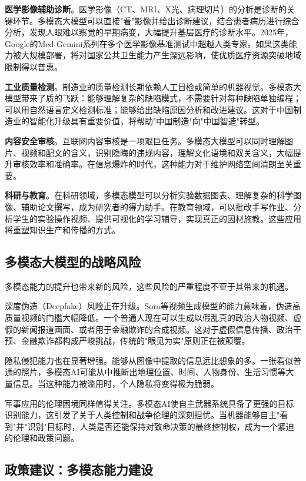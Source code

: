 \textbf{医学影像辅助诊断}。医学影像（CT、MRI、X光、病理切片）的分析是诊断的关键环节。多模态大模型可以直接"看"影像并给出诊断建议，结合患者病历进行综合分析，发现人眼难以察觉的早期病变，大幅提升基层医疗的诊断水平。2025年，Google的Med-Gemini系列在多个医学影像基准测试中超越人类专家。如果这类能力被大规模部署，将对国家公共卫生能力产生深远影响，使优质医疗资源突破地域限制得以普惠。

\textbf{工业质量检测}。制造业的质量检测长期依赖人工目检或简单的机器视觉。多模态大模型带来了质的飞跃：能够理解复杂的缺陷模式，不需要针对每种缺陷单独编程；可以用自然语言定义检测标准；能够给出缺陷原因分析和改进建议。这对于中国制造业的智能化升级具有重要价值，将帮助"中国制造"向"中国智造"转型。

\textbf{内容安全审核}。互联网内容审核是一项艰巨任务。多模态大模型可以同时理解图片、视频和配文的含义，识别隐晦的违规内容，理解文化语境和双关含义，大幅提升审核效率和准确率。在信息爆炸的时代，这种能力对于维护网络空间清朗至关重要。

\textbf{科研与教育}。在科研领域，多模态模型可以分析实验数据图表、理解复杂的科学图像、辅助论文撰写，成为研究者的得力助手。在教育领域，可以批改手写作业、分析学生的实验操作视频、提供可视化的学习辅导，实现真正的因材施教。这些应用将重塑知识生产和传播的方式。

\subsection{多模态大模型的战略风险}

多模态能力的提升也带来新的风险，这些风险的严重程度不亚于其带来的机遇。

深度伪造（Deepfake）风险正在升级。Sora等视频生成模型的能力意味着，伪造高质量视频的门槛大幅降低。一个普通人现在可以生成以假乱真的政治人物视频、虚假的新闻报道画面、或者用于金融欺诈的合成视频。这对于虚假信息传播、政治干预、金融欺诈都构成严峻挑战，传统的"眼见为实"原则正在被颠覆。

隐私侵犯能力也在显著增强。能够从图像中提取的信息远比想象的多。一张看似普通的照片，多模态AI可能从中推断出地理位置、时间、人物身份、生活习惯等大量信息。当这种能力被滥用时，个人隐私将变得极为脆弱。

军事应用的伦理困境同样值得关注。多模态AI使自主武器系统具备了更强的目标识别能力，这引发了关于人类控制和战争伦理的深刻担忧。当机器能够自主"看到"并"识别"目标时，人类是否还能保持对致命决策的最终控制权，成为一个紧迫的伦理和政策问题。

\subsection{政策建议：多模态能力建设}


